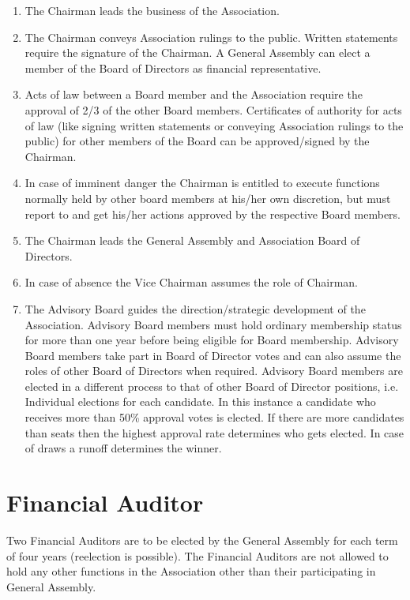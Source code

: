 \begin{enumerate}
\item The Chairman leads the business of the Association.
\item The Chairman conveys Association rulings to the public. Written statements require the signature of the Chairman. A General Assembly can elect a member of the Board of Directors as financial representative.
\item Acts of law between a Board member and the Association require the approval of 2/3 of the other Board members. Certificates of authority for acts of law (like signing written statements or conveying Association rulings to the public) for other members of the Board can be approved/signed by the Chairman.
\item In case of imminent danger the Chairman is entitled to execute functions normally held by other board members at his/her own discretion, but must report to and get his/her actions approved by the respective Board members.
\item The Chairman leads the General Assembly and Association Board of Directors.
\item In case of absence the Vice Chairman assumes the role of Chairman.
\item The Advisory Board guides the direction/strategic development of the Association. Advisory Board members must hold ordinary membership status for more than one year before being eligible for Board membership. Advisory Board members take part in Board of Director votes and can also assume the roles of other Board of Directors when required. Advisory Board members are elected in a different process to that of other Board of Director positions, i.e. Individual elections for each candidate. In this instance a candidate who receives more than 50\% approval votes is elected. If there are more candidates than seats then the highest approval rate determines who gets elected. In case of draws a runoff determines the winner.
\end{enumerate}




\section{Financial Auditor}

Two Financial Auditors are to be elected by the General Assembly for each term of four years (reelection is possible). The Financial Auditors are not allowed to hold any other functions in the Association other than their participating in General Assembly.\\

